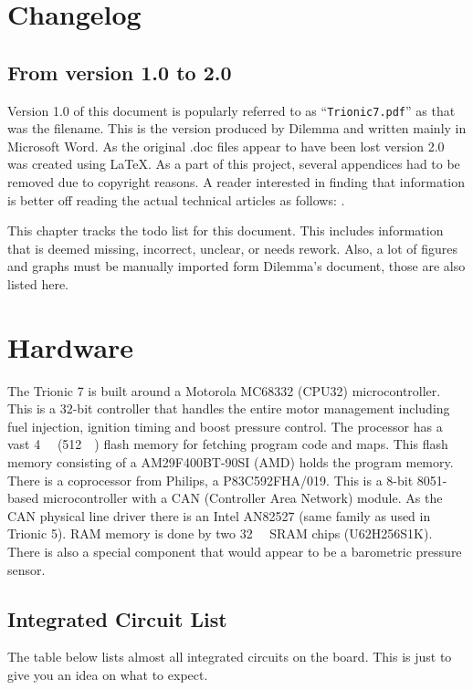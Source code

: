 \documentclass[11pt,a4paper]{book}
\begin{document}
\chapter{Changelog}
\section*{From version 1.0 to 2.0}
Version 1.0 of this document is popularly referred to as
\enquote{\texttt{Trionic7.pdf}} as that was the filename. This is the version
produced by Dilemma and written mainly in Microsoft Word. As the original .doc
files appear to have been lost version 2.0 was created using \LaTeX{}. As a part
of this project, several appendices had to be removed due to copyright reasons.
A reader interested in finding that information is better off reading the actual
technical articles as follows:
\textcite{EstillIntercooler,FerozepuriaTurbocharger,Eriksson1998}.

This chapter tracks the todo list for this document. This includes information
that is deemed missing, incorrect, unclear, or needs rework. Also, a lot of
figures and graphs must be manually imported form Dilemma's document, those are
also listed here.


\tableofcontents
\mainmatter
\chapter{Hardware}
The Trionic 7 is built around a Motorola MC68332 (CPU32) microcontroller. This
is a 32-bit controller that handles the entire motor management including fuel
injection, ignition timing and boost pressure control. The processor has a vast
\SI{4}{\mega\byte} (\SI{512}{\kilo\byte}) flash memory for fetching program code
and maps. This flash memory consisting of a AM29F400BT-90SI (AMD) holds the
program memory. There is a coprocessor from Philips, a P83C592FHA/019. This is a
8-bit 8051-based microcontroller with a CAN (Controller Area Network) module. As
the CAN physical line driver there is an Intel AN82527 (same family as used in
Trionic 5). RAM memory is done by two \SI{32}{\kilo\bit} SRAM chips
(U62H256S1K). There is also a special component that would appear to be a
barometric pressure sensor.

\section{Integrated Circuit List}
The table below lists almost all integrated circuits on the board. This is just to give you an idea on what to expect.
\end{document}
